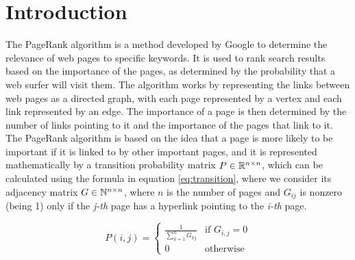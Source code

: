 \section{Introduction}


The PageRank algorithm is a method developed by Google to determine the relevance of web pages to specific keywords. It is used to rank search results based on the importance of the pages, as determined by the probability that a web surfer will visit them. The algorithm works by representing the links between web pages as a directed graph, with each page represented by a vertex and each link represented by an edge. The importance of a page is then determined by the number of links pointing to it and the importance of the pages that link to it. The PageRank algorithm is based on the idea that a page is more likely to be important if it is linked to by other important pages, and it is represented mathematically by a transition probability matrix $P \in \mathbb{R}^{n \times n}$, which can be calculated using the formula in equation \ref{eq:transition}, where we consider its adjacency matrix $G \in \mathbb{N}^{n \times n}$, where $n$ is the number of pages and $G_{ij}$ is nonzero (being 1) only if the \emph{j-th} page has a hyperlink pointing to the \emph{i-th} page.

\begin{equation}\label{eq:transition}
    P(i,j) =
    \begin{cases}
        \displaystyle \frac{1}{\sum_{k=1}^n G_{kj}} & \text{if } G_{i,j} = 0 \\
        0 & \text{otherwise}
    \end{cases}
\end{equation}

